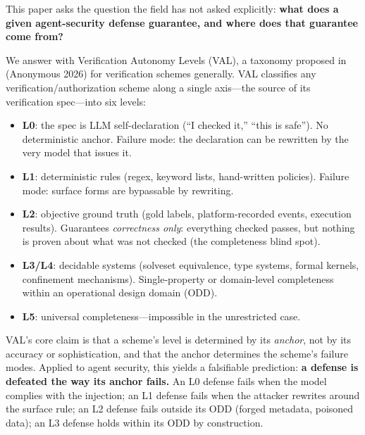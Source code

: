 \documentclass[

]{article}
\providecommand{\tightlist}{%

  \setlength{\itemsep}{0pt}\setlength{\parskip}{0pt}}
\begin{document}
This paper asks the question the field has not asked explicitly: \textbf{what does a given agent-security defense guarantee, and where does that guarantee come from?}



We answer with Verification Autonomy Levels (VAL), a taxonomy proposed in (Anonymous 2026) for verification schemes generally. VAL classifies any verification/authorization scheme along a single axis---the source of its verification spec---into six levels:



\begin{itemize}

\tightlist

\item

  \textbf{L0}: the spec is LLM self-declaration (``I checked it,'' ``this is safe''). No deterministic anchor. Failure mode: the declaration can be rewritten by the very model that issues it.

\item

  \textbf{L1}: deterministic rules (regex, keyword lists, hand-written policies). Failure mode: surface forms are bypassable by rewriting.

\item

  \textbf{L2}: objective ground truth (gold labels, platform-recorded events, execution results). Guarantees \emph{correctness only}: everything checked passes, but nothing is proven about what was not checked (the completeness blind spot).

\item

  \textbf{L3/L4}: decidable systems (solveset equivalence, type systems, formal kernels, confinement mechanisms). Single-property or domain-level completeness within an operational design domain (ODD).

\item

  \textbf{L5}: universal completeness---impossible in the unrestricted case.

\end{itemize}



VAL's core claim is that a scheme's level is determined by its \emph{anchor}, not by its accuracy or sophistication, and that the anchor determines the scheme's failure modes. Applied to agent security, this yields a falsifiable prediction: \textbf{a defense is defeated the way its anchor fails.} An L0 defense fails when the model complies with the injection; an L1 defense fails when the attacker rewrites around the surface rule; an L2 defense fails outside its ODD (forged metadata, poisoned data); an L3 defense holds within its ODD by construction.
\end{document}
